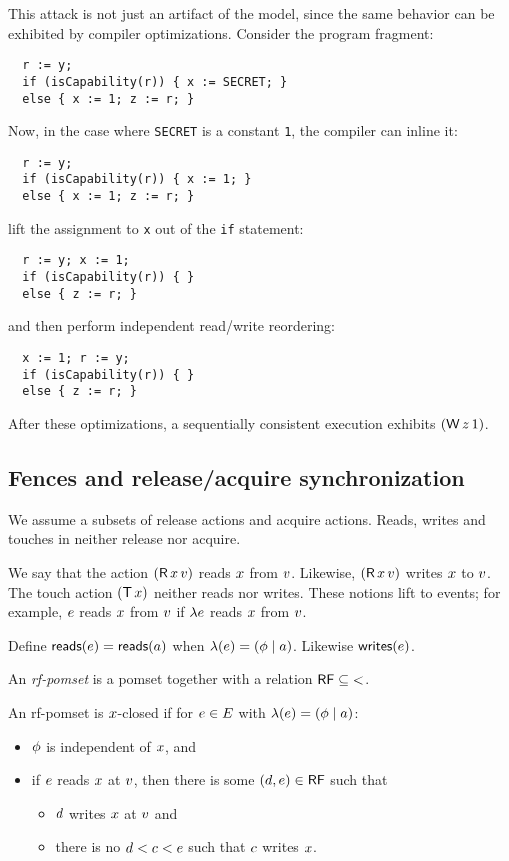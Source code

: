 This attack is not just an artifact of the model,
since the same behavior can be exhibited by
compiler optimizations. Consider the program fragment:
\begin{verbatim}
  r := y;
  if (isCapability(r)) { x := SECRET; }
  else { x := 1; z := r; }
\end{verbatim}
Now, in the case where \verb|SECRET| is a constant \verb|1|,
the compiler can inline it:
\begin{verbatim}
  r := y;
  if (isCapability(r)) { x := 1; }
  else { x := 1; z := r; }
\end{verbatim}
lift the assignment to \verb|x| out of the \verb|if| statement:
\begin{verbatim}
  r := y; x := 1;
  if (isCapability(r)) { }
  else { z := r; }
\end{verbatim}
and then perform independent read/write reordering:
\begin{verbatim}
  x := 1; r := y;
  if (isCapability(r)) { }
  else { z := r; }
\end{verbatim}
After these optimizations, a sequentially consistent execution
exhibits $(\mathsf{W}\,z\,1)$.

\subsection{Fences and release/acquire synchronization}

We assume a subsets of release actions %
and acquire actions. %
Reads, writes and touches in neither release nor acquire.

We say that the action $(\mathsf{R}\,x\,v)$ reads $x$ from $v$.
Likewise, $(\mathsf{R}\,x\,v)$ writes $x$ to $v$.  The touch action
$(\mathsf{T}\,x)$ neither reads nor writes.  These notions lift to events; for example, $e$
reads $x$ from $v$ if $\lambda{e}$ reads $x$ from $v$.

Define $\mathsf{reads}(e) = \mathsf{reads}(a)$ when $\lambda(e) = (\phi \mid a)$.
Likewise $\mathsf{writes}(e)$.
\begin{definition}
  An \emph{rf-pomset} is a pomset together with a relation
  $\mathord{\mathsf{RF}} \subseteq \mathord{<}$.
\end{definition}
\begin{definition}
  An rf-pomset is $x$-closed if
  for $e\in E$ with $\lambda(e)=(\phi \mid a)$:
  \begin{itemize}
  \item $\phi$ is independent of $x$, and
  \item if $e$ reads $x$ at $v$, then there is some
    $(d,e) \in \mathsf{RF}$ such that
    \begin{itemize}
    \item $d$ writes $x$ at $v$ and
    \item there is no $d < c < e$ such that $c$ writes $x$.
    \end{itemize}
  \end{itemize}
\end{definition}

